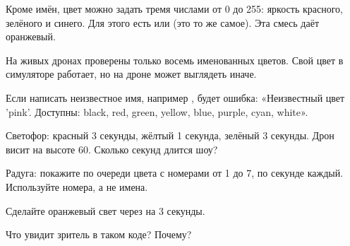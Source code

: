 Кроме имён, цвет можно задать тремя числами от 0 до 255: яркость красного, зелёного и синего. Для этого есть  или  (это то же самое). Эта смесь даёт оранжевый.

\begin{zametka}
На живых дронах проверены только восемь именованных цветов. Свой цвет в симуляторе работает, но на дроне может выглядеть иначе.
\end{zametka}

Если написать неизвестное имя, например , будет ошибка: «Неизвестный цвет 'pink'. Доступны: black, red, green, yellow, blue, purple, cyan, white».

\begin{probuy}
  \item Светофор: красный 3 секунды, жёлтый 1 секунда, зелёный 3 секунды. Дрон висит на высоте 60\cm. Сколько секунд длится шоу?
  \item Радуга: покажите по очереди цвета с номерами от 1 до 7, по секунде каждый. Используйте номера, а не имена.
  \item Сделайте оранжевый свет через  на 3 секунды.
  \item Что увидит зритель в таком коде? Почему?\\
  \quad{}\quad{}
\end{probuy}
